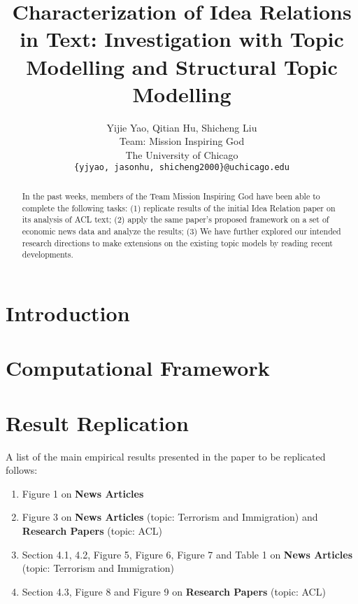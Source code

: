 \documentclass[11pt,a4paper]{article}
\title{Characterization of Idea Relations in Text: Investigation with Topic Modelling and Structural Topic Modelling}
\author{Yijie Yao, Qitian Hu, Shicheng Liu\\
Team: Mission Inspiring God \\
The University of Chicago  \\
  \texttt{\{yjyao, jasonhu, shicheng2000\}@uchicago.edu} \\}
\begin{document}
\maketitle
\begin{abstract}
In the past weeks, members of the Team Mission Inspiring God have been able to 
complete the following tasks: (1) replicate results of the initial Idea Relation paper
\citet{chenhao-idea-relations} on its analysis of ACL text; (2) apply the same paper's 
proposed framework on a set of economic news data \cite{econ-news-dataset} and 
analyze the results; (3) We have further explored our intended research directions to make extensions on the existing topic models by reading recent developments.
\end{abstract}


\section{Introduction}

\section{Computational Framework}

\section{Result Replication}

A list of the main empirical results presented in the paper to be replicated
\cite{chenhao-idea-relations} follows:

\begin{enumerate}
  \item Figure 1 on \textbf{News Articles}
  \item Figure 3 on \textbf{News Articles} (topic: Terrorism and Immigration)
   and \textbf{Research Papers} (topic: ACL)
  \item Section 4.1, 4.2, Figure 5, Figure 6, Figure 7 and Table 1 on 
  \textbf{News Articles} (topic: Terrorism and Immigration)
  \item Section 4.3, Figure 8 and Figure 9 on \textbf{Research Papers} 
  (topic: ACL)
\end{enumerate}

\end{document}
